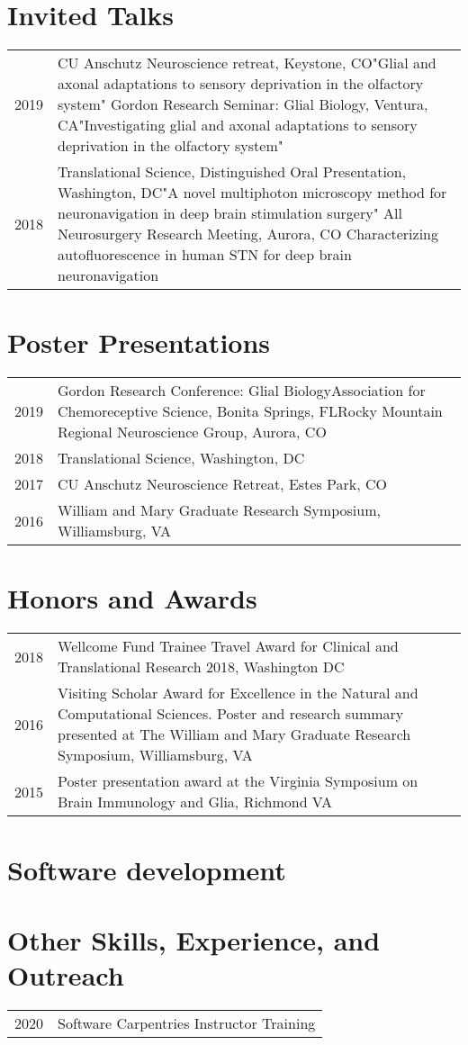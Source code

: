 \documentclass[11pt]{article}
\begin{document}
\section*{Invited Talks}
\label{sec:org01a987f}
\begin{tabular}{lp{}}
2019& CU Anschutz Neuroscience retreat, Keystone, CO\newline "Glial and axonal adaptations to sensory deprivation in the olfactory system" \newline Gordon Research Seminar: Glial Biology, Ventura, CA\newline "Investigating glial and axonal adaptations to sensory deprivation in the olfactory system"\\
2018& Translational Science, Distinguished Oral Presentation, Washington, DC\newline "A novel multiphoton microscopy method for neuronavigation in deep brain stimulation surgery"
\newline All Neurosurgery Research Meeting, Aurora, CO \newline Characterizing autofluorescence in human STN for deep brain neuronavigation
\end{tabular}
\section*{Poster Presentations}
\label{sec:org5c6f73b}
\begin{tabular}{lp{}}
2019& Gordon Research Conference: Glial Biology\newline Association for Chemoreceptive Science, Bonita Springs, FL\newline Rocky Mountain Regional Neuroscience Group, Aurora, CO\\
2018& Translational Science, Washington, DC\\
2017& CU Anschutz Neuroscience Retreat, Estes Park, CO\\
2016& William and Mary Graduate Research Symposium, Williamsburg, VA
\end{tabular}
\section*{Honors and Awards}
\label{sec:orgbab95e4}
\begin{tabular}{lp{}}
2018& Wellcome Fund Trainee Travel Award for Clinical and Translational Research 2018, Washington DC\\
2016& Visiting Scholar Award for Excellence in the Natural and Computational Sciences. Poster and research summary presented at The William and Mary Graduate Research Symposium, Williamsburg, VA \\
2015& Poster presentation award at the Virginia Symposium on Brain Immunology and Glia, Richmond VA
\end{tabular}
\section*{Software development}
\label{sec:org9310dae}
\section*{Other Skills, Experience, and Outreach}
\label{sec:org275f485}
\begin{tabular}{lp{}}
2020& Software Carpentries Instructor Training
\end{tabular}
\end{document}
